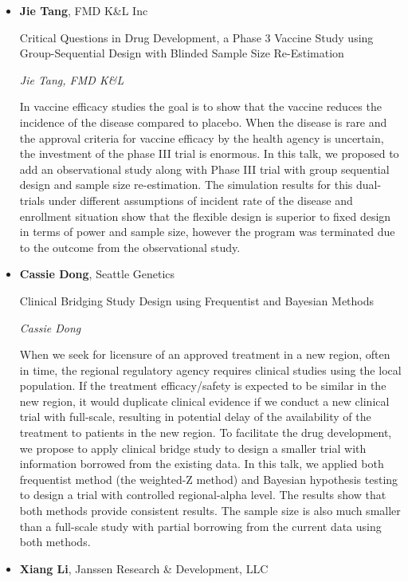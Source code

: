 \begin{itemize}
\item \textbf{Jie Tang}, FMD K\&L Inc

Critical Questions in Drug Development, a Phase 3 Vaccine Study using Group-Sequential Design with Blinded Sample Size Re-Estimation

\emph{\footnotesize Jie Tang, FMD K\&L}

In vaccine efficacy studies the goal is to show that the vaccine reduces the incidence of the disease compared to placebo. When the disease is rare and the approval criteria for vaccine efficacy by the health agency is uncertain,  the investment of the phase III trial is enormous. In this talk, we proposed to add an observational study along with Phase III trial with group sequential design and  sample size re-estimation. The simulation results for this dual-trials under different assumptions of incident rate of the disease and enrollment situation show that the flexible design is superior to fixed design in terms of power and sample size, however the program was terminated due to the outcome from the observational study.

\item \textbf{Cassie Dong}, Seattle Genetics

Clinical Bridging Study Design using Frequentist and Bayesian Methods

\emph{\footnotesize Cassie Dong}

When we seek for licensure of an approved treatment in a new region, often in time, the regional regulatory agency requires clinical studies using the local population. If the treatment efficacy/safety is expected to be similar in the new region, it would duplicate clinical evidence if we conduct a new clinical trial with full-scale, resulting in potential delay of the availability of the treatment to patients in the new region. To facilitate the drug development, we propose to apply clinical bridge study to design a smaller trial with information borrowed from the existing data. In this talk, we applied both frequentist method (the weighted-Z method) and Bayesian hypothesis testing to design a trial with controlled regional-alpha level. The results show that both methods provide consistent results. The sample size is also much smaller than a full-scale study with partial borrowing from the current data using both methods.

\item \textbf{Xiang Li}, Janssen Research \& Development, LLC


\end{itemize}
